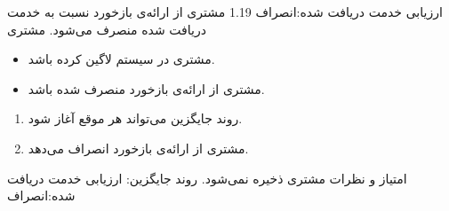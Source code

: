 {\alternativeflow
{
ارزیابی خدمت دریافت شده:انصراف
}
{1.19}
{
مشتری از ارائه‌ی بازخورد نسبت به خدمت دریافت شده منصرف می‌شود.
}
{
	مشتری
}
{}
{
	\begin{itemize}
		\vspace*{-0.6cm}
		\item 
		مشتری در سیستم لاگین کرده باشد.
		\item
		مشتری از ارائه‌ی بازخورد منصرف شده باشد.
	\end{itemize}
}
{
	\vspace*{-0.6cm}
	\begin{enumerate}
		\item 
		روند جایگزین می‌تواند هر موقع آغاز شود.
		\item
		مشتری از ارائه‌ی بازخورد انصراف می‌دهد.
	\end{enumerate}
}
{
امتیاز و نظرات مشتری ذخیره نمی‌شود.
}
{
روند جایگزین: ارزیابی خدمت دریافت شده:انصراف
}


}

